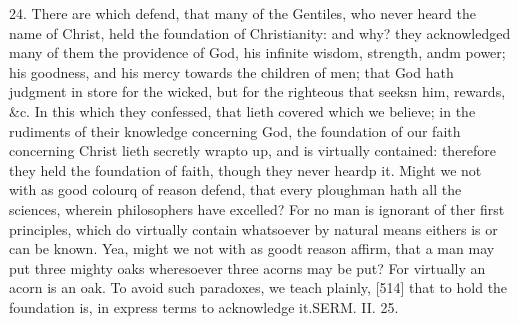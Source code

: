 24. There are which defend, that many of the Gentiles, who never heard the name of Christ, held the foundation of Christianity: and why? they acknowledged many of them the providence of God, his infinite wisdom, strength, andm power; his goodness, and his mercy towards the children of men; that God hath judgment in store for the wicked, but for the righteous that seeksn him, rewards, &c. In this which they confessed, that lieth covered which we believe; in the rudiments of their knowledge concerning God, the foundation of our faith concerning Christ lieth secretly wrapto up, and is virtually contained: therefore they held the foundation of faith, though they never heardp it. Might we not with as good colourq of reason defend, that every ploughman hath all the sciences, wherein philosophers have excelled? For no man is ignorant of ther first principles, which do virtually contain whatsoever by natural means eithers is or can be known. Yea, might we not with as goodt reason affirm, that a man may put three mighty oaks wheresoever three acorns may be put? For virtually an acorn is an oak. To avoid such paradoxes, we teach plainly, [514] that to hold the foundation is, in express terms to acknowledge it.SERM. II. 25.

